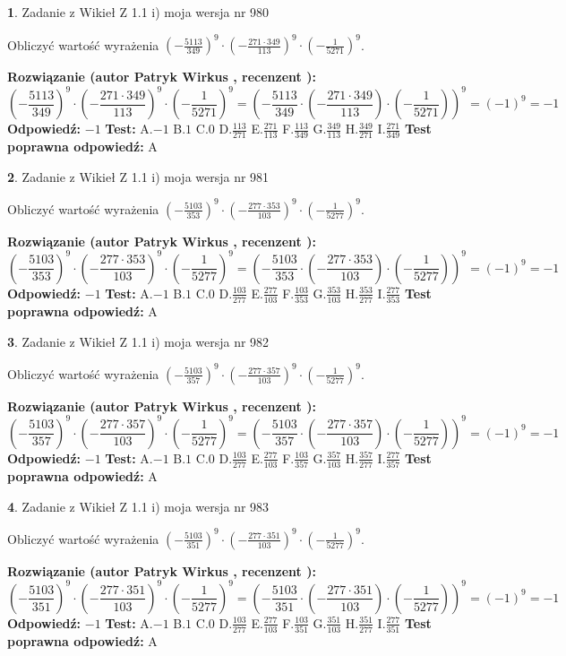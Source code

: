 \documentclass[12pt, a4paper]{article}
\theoremstyle{definition} %
\newtheorem{zad}{}
\newcommand{\zadStart}[1]{\begin{zad}#1\newline}
\newcommand{\zadStop}{\end{zad}}
\newcommand{\rozwStart}[2]{\noindent \textbf{Rozwiązanie (autor #1 , recenzent #2): }\newline}
\newcommand{\rozwStop}{\newline}
\newcommand{\odpStart}{\noindent \textbf{Odpowiedź:}\newline}
\newcommand{\odpStop}{\newline}
\newcommand{\testStart}{\noindent \textbf{Test:}\newline}
\newcommand{\testStop}{\newline}
\newcommand{\kluczStart}{\noindent \textbf{Test poprawna odpowiedź:}\newline}
\newcommand{\kluczStop}{\newline}
\begin{document}
\zadStart{Zadanie z Wikieł Z 1.1 i) moja wersja nr 980}

Obliczyć wartość wyrażenia $(-\frac{5113}{349})^{9} \cdot (-\frac{271 \cdot 349}{113})^{9} \cdot (-\frac{1}{5271})^{9}$.
\zadStop
\rozwStart{Patryk Wirkus}{}
$$(-\frac{5113}{349})^{9} \cdot (-\frac{271 \cdot 349}{113})^{9} \cdot (-\frac{1}{5271})^{9} = (-\frac{5113}{349} \cdot (-\frac{271 \cdot 349}{113}) \cdot (-\frac{1}{5271}))^{9} = (-1)^{9} = -1$$
\rozwStop
\odpStart
$-1$
\odpStop
\testStart
A.$-1$ B.$1$ C.$0$ D.$\frac{113}{271}$ E.$\frac{271}{113}$
F.$\frac{113}{349}$ G.$\frac{349}{113}$
H.$\frac{349}{271}$
I.$\frac{271}{349}$
\testStop
\kluczStart
A
\kluczStop



\zadStart{Zadanie z Wikieł Z 1.1 i) moja wersja nr 981}

Obliczyć wartość wyrażenia $(-\frac{5103}{353})^{9} \cdot (-\frac{277 \cdot 353}{103})^{9} \cdot (-\frac{1}{5277})^{9}$.
\zadStop
\rozwStart{Patryk Wirkus}{}
$$(-\frac{5103}{353})^{9} \cdot (-\frac{277 \cdot 353}{103})^{9} \cdot (-\frac{1}{5277})^{9} = (-\frac{5103}{353} \cdot (-\frac{277 \cdot 353}{103}) \cdot (-\frac{1}{5277}))^{9} = (-1)^{9} = -1$$
\rozwStop
\odpStart
$-1$
\odpStop
\testStart
A.$-1$ B.$1$ C.$0$ D.$\frac{103}{277}$ E.$\frac{277}{103}$
F.$\frac{103}{353}$ G.$\frac{353}{103}$
H.$\frac{353}{277}$
I.$\frac{277}{353}$
\testStop
\kluczStart
A
\kluczStop



\zadStart{Zadanie z Wikieł Z 1.1 i) moja wersja nr 982}

Obliczyć wartość wyrażenia $(-\frac{5103}{357})^{9} \cdot (-\frac{277 \cdot 357}{103})^{9} \cdot (-\frac{1}{5277})^{9}$.
\zadStop
\rozwStart{Patryk Wirkus}{}
$$(-\frac{5103}{357})^{9} \cdot (-\frac{277 \cdot 357}{103})^{9} \cdot (-\frac{1}{5277})^{9} = (-\frac{5103}{357} \cdot (-\frac{277 \cdot 357}{103}) \cdot (-\frac{1}{5277}))^{9} = (-1)^{9} = -1$$
\rozwStop
\odpStart
$-1$
\odpStop
\testStart
A.$-1$ B.$1$ C.$0$ D.$\frac{103}{277}$ E.$\frac{277}{103}$
F.$\frac{103}{357}$ G.$\frac{357}{103}$
H.$\frac{357}{277}$
I.$\frac{277}{357}$
\testStop
\kluczStart
A
\kluczStop



\zadStart{Zadanie z Wikieł Z 1.1 i) moja wersja nr 983}

Obliczyć wartość wyrażenia $(-\frac{5103}{351})^{9} \cdot (-\frac{277 \cdot 351}{103})^{9} \cdot (-\frac{1}{5277})^{9}$.
\zadStop
\rozwStart{Patryk Wirkus}{}
$$(-\frac{5103}{351})^{9} \cdot (-\frac{277 \cdot 351}{103})^{9} \cdot (-\frac{1}{5277})^{9} = (-\frac{5103}{351} \cdot (-\frac{277 \cdot 351}{103}) \cdot (-\frac{1}{5277}))^{9} = (-1)^{9} = -1$$
\rozwStop
\odpStart
$-1$
\odpStop
\testStart
A.$-1$ B.$1$ C.$0$ D.$\frac{103}{277}$ E.$\frac{277}{103}$
F.$\frac{103}{351}$ G.$\frac{351}{103}$
H.$\frac{351}{277}$
I.$\frac{277}{351}$
\testStop
\kluczStart
A
\kluczStop
\end{document}
